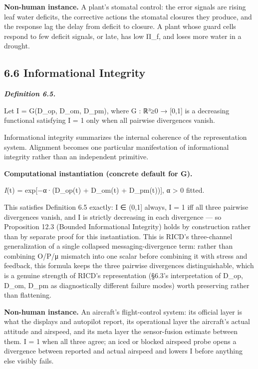 \documentclass[
]{article}
\begin{document}
\textbf{Non-human instance.} A plant's stomatal control: the error
signals are rising leaf water deficits, the corrective actions the
stomatal closures they produce, and the response lag the delay from
deficit to closure. A plant whose guard cells respond to few deficit
signals, or late, has low Π\_f, and loses more water in a drought.

\hypertarget{informational-integrity}{%
\subsection{6.6 Informational Integrity}\label{informational-integrity}}

\emph{\textbf{Definition 6.5.}}

Let I = G(D\_op, D\_om, D\_pm), where G : ℝ³≥0 → {[}0,1{]} is a
decreasing functional satisfying I = 1 only when all pairwise
divergences vanish.

Informational integrity summarizes the internal coherence of the
representation system. Alignment becomes one particular manifestation of
informational integrity rather than an independent primitive.

\textbf{Computational instantiation (concrete default for G).}

\emph{I}(t) = exp{[}−α·(D\_op(t) + D\_om(t) + D\_pm(t)){]}, α
\textgreater{} 0 fitted.

This satisfies Definition 6.5 exactly: I ∈ (0,1{]} always, I = 1 iff all
three pairwise divergences vanish, and I is strictly decreasing in each
divergence --- so Proposition 12.3 (Bounded Informational Integrity)
holds by construction rather than by separate proof for this
instantiation. This is RICD's three-channel generalization of a single
collapsed messaging-divergence term: rather than combining O/P/μ
mismatch into one scalar before combining it with stress and feedback,
this formula keeps the three pairwise divergences distinguishable, which
is a genuine strength of RICD's representation (§6.3's interpretation of
D\_op, D\_om, D\_pm as diagnostically different failure modes) worth
preserving rather than flattening.

\textbf{Non-human instance.} An aircraft's flight-control system: its
official layer is what the displays and autopilot report, its
operational layer the aircraft's actual attitude and airspeed, and its
meta layer the sensor-fusion estimate between them. I = 1 when all three
agree; an iced or blocked airspeed probe opens a divergence between
reported and actual airspeed and lowers I before anything else visibly
fails.
\end{document}

